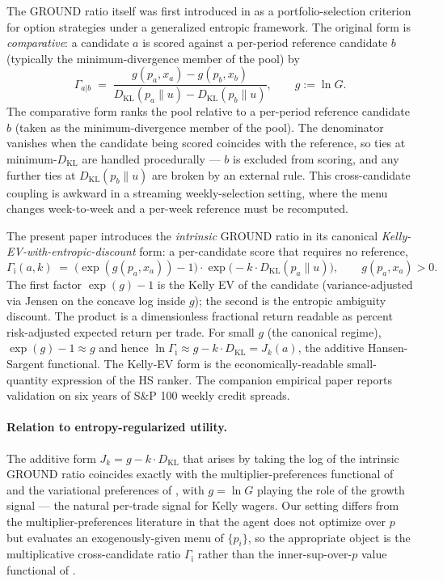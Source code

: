 \documentclass[11pt]{article}
\theoremstyle{definition}
\theoremstyle{remark}
\newcommand{\G}{g}
\newcommand{\KL}{D_{\mathrm{KL}}}
\newcommand{\GROUND}{\Gamma_{\mathrm{i}}}
\begin{document}
The GROUND ratio itself was first introduced in
\citet{mercurio2020} as a portfolio-selection criterion for option
strategies under a generalized entropic framework. The original form
is \emph{comparative}: a candidate $a$ is scored against a per-period
reference candidate $b$ (typically the minimum-divergence member of
the pool) by
\[
\Gamma_{a|b} \;=\; \frac{\G(p_a, x_a) - \G(p_b, x_b)}{\KL(p_a \| u) - \KL(p_b \| u)},
\qquad \G := \ln G.
\]
The comparative form ranks the pool relative to a per-period
reference candidate $b$ (taken as the minimum-divergence member of
the pool). The denominator vanishes when the candidate being scored
coincides with the reference, so ties at minimum-$\KL$ are handled
procedurally --- $b$ is excluded from scoring, and any further ties
at $\KL(p_b \| u)$ are broken by an external rule. This cross-candidate
coupling is awkward in a streaming weekly-selection setting,
where the menu changes week-to-week and a per-week reference must be
recomputed.

The present paper introduces the \emph{intrinsic} GROUND ratio in its
canonical \emph{Kelly-EV-with-entropic-discount} form: a per-candidate
score that requires no reference,
\[
\GROUND(a, k) \;=\; \bigl(\exp(\G(p_a, x_a)) - 1\bigr) \cdot \exp\!\bigl(-k \cdot \KL(p_a \| u)\bigr),
\qquad \G(p_a, x_a) > 0.
\]
The first factor $\exp(\G) - 1$ is the Kelly EV of the candidate
(variance-adjusted via Jensen on the concave log inside $\G$); the
second is the entropic ambiguity discount. The product is a
dimensionless fractional return readable as percent risk-adjusted
expected return per trade. For small $\G$ (the canonical regime),
$\exp(\G) - 1 \approx \G$ and hence $\ln \GROUND \approx \G - k \cdot
\KL = J_k(a)$, the additive Hansen-Sargent functional. The Kelly-EV
form is the economically-readable small-quantity expression of the HS
ranker. The companion empirical paper
\citep{mercurio2026empirical} reports validation on six years of
S\&P 100 weekly credit spreads.

\paragraph{Relation to entropy-regularized utility.}
The additive form $J_k = \G - k \cdot \KL$ that arises by taking the
log of the intrinsic GROUND ratio coincides exactly with the
multiplier-preferences functional of
\citet{hansen2008robustness} and the variational preferences of
\citet{maccheroni2006ambiguity}, with $\G = \ln G$ playing the role
of the growth signal --- the natural per-trade signal for Kelly
wagers. Our setting differs from the multiplier-preferences
literature in that the agent does not optimize over $p$ but
evaluates an exogenously-given menu of $\{p_i\}$, so the appropriate
object is the multiplicative cross-candidate ratio $\GROUND$ rather
than the inner-sup-over-$p$ value functional of
\citet{hansen2008robustness}.
\end{document}
